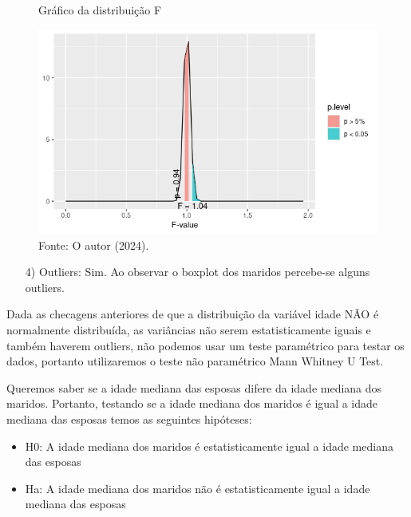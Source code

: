 \begin{figure}[H]
\centering
\caption{Gráfico da distribuição F}
\includegraphics[width=.9\textwidth]{apendices/fig/4_IAA004_5.png} 
\caption*{Fonte: O autor (2024).}
\label{fig:subim1}
\end{figure}

\begin{enumerate}
    \item[4)] Outliers: Sim. Ao observar o boxplot dos maridos percebe-se alguns outliers.
\end{enumerate}

Dada as checagens anteriores de que a distribuição da variável idade NÃO é normalmente distribuída, as variâncias não serem estatisticamente iguais e também haverem outliers, não podemos usar um teste paramétrico para testar os dados, portanto utilizaremos o teste não paramétrico Mann Whitney U Test.

Queremos saber se a idade mediana das esposas difere da idade mediana dos maridos. Portanto, testando se a idade mediana dos maridos é igual a idade mediana das esposas temos as seguintes hipóteses:

\begin{itemize}
\item  H0: A idade mediana dos maridos é estatisticamente igual a idade mediana das esposas
\item  Ha: A idade mediana dos maridos não é estatisticamente igual a idade mediana das esposas\hfill \break
\end{itemize}

